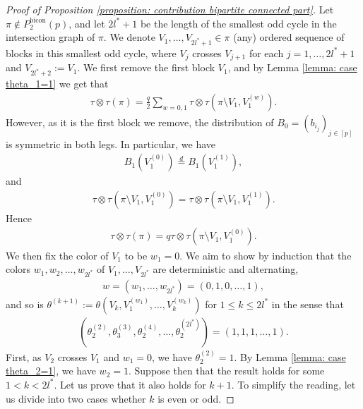\documentclass[12pt,reqno]{amsart}
\theoremstyle{plain}
\newcommand{\1}{\mathbf{1}}
\begin{document}
\begin{proof}[Proof of Proposition \ref{proposition: contribution bipartite connected part}]
    Let $\pi \notin P_2^{\operatorname{bicon}}(p)$, and let $2l^*+1$ be the length of the smallest odd cycle in the intersection graph of $\pi$. We denote $V_1,\ldots, V_{2l^*+1} \in \pi$ (any) ordered sequence of blocks in this smallest odd cycle, where $V_{j}$ crosses $V_{j+1}$ for each $j=1,\ldots,2l^*+1$ and $V_{2l^*+2}:=V_1$. We first remove the first block $V_1$, and by Lemma \ref{lemma: case theta_1=1} we get that
    \begin{align*}
        \tau\otimes\tau(\pi)=\frac{q}{2}\sum_{w=0,1}\tau\otimes\tau\left(\pi\setminus V_1,V_1^{(w)}\right).
    \end{align*}
    However, as it is the first block we remove, the distribution of $B_0=(b_{i_j})_{j \in [p]}$ is symmetric in both legs. In particular, we have
    \begin{align*}
        B_1(V_1^{(0)})\overset{d}{=}B_1(V_1^{(1)}),
    \end{align*}
    and
    \begin{align*}
        \tau\otimes\tau\left(\pi\setminus V_1,V_1^{(0)}\right)=\tau\otimes\tau\left(\pi\setminus V_1,V_1^{(1)}\right).
    \end{align*}
    Hence
    \begin{align*}
        \tau\otimes\tau(\pi)=q\tau\otimes\tau\left(\pi\setminus V_1,V_1^{(0)}\right).
    \end{align*}
    We then fix the color of $V_1$ to be $w_1=0$. We aim to show by induction that the colors $w_1,w_2,\ldots,w_{2l^*}$ of $V_1,\ldots,V_{2l^*}$ are deterministic and alternating, 
    \begin{align*}
        w=(w_1,\ldots,w_{2l^*})=(0,1,0,\ldots,1),
    \end{align*}
    and so is $\theta^{(k+1)}:=\theta\left(V_k,V_1^{(w_1)},\ldots,V_{k}^{(w_{k})}\right)$ for $1 \le k \le 2l^*$ in the sense that
    \begin{align*}
        \left(\theta^{(2)}_2,\theta^{(3)}_3,\theta^{(4)}_2,\ldots,\theta^{(2l^*)}_2\right)=(1,1,1,\ldots,1).
    \end{align*}
    First, as $V_2$ crosses $V_1$ and $w_1=0$, we have $\theta^{(2)}_2=1$. By Lemma \ref{lemma: case theta_2=1}, we have $w_2=1$. Suppose then that the result holds for some $1 < k < 2l^*$. Let us prove that it also holds for $k+1$. To simplify the reading, let us divide into two cases whether $k$ is even or odd.


\end{proof}
\end{document}
